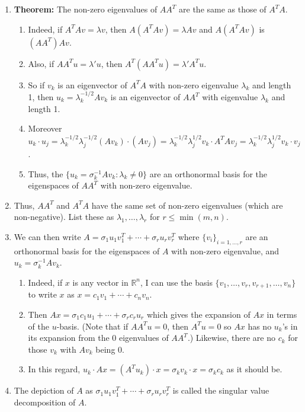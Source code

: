 \begin{enumerate}
    \item \textbf{Theorem:} The non-zero eigenvalues of $A A^T$ are the same as those of $A^T A$.
    \begin{enumerate}    \setlength{\itemsep}{5em}

        \item Indeed, if $A^T A v = \lambda v$, then $A (A^T A v) = \lambda A v$ and $A (A^T A v)$ is $(A A^T) A v$.
        \item Also, if $A A^T u = \lambda' u$, then $A^T (A A^T u) = \lambda' A^T u$.
        \item So if $v_k$ is an eigenvector of $A^T A$ with non-zero eigenvalue $\lambda_k$ and length 1, then $u_k = \lambda_k^{-1/2} A v_k$ is an eigenvector of $A A^T$ with eigenvalue $\lambda_k$ and length 1.
        \item Moreover $u_k \cdot u_j = \lambda_k^{-1/2} \lambda_j^{-1/2} (A v_k) \cdot (A v_j) = \lambda_k^{-1/2} \lambda_j^{1/2} v_k \cdot A^T A v_j = \lambda_k^{-1/2} \lambda_j^{1/2} v_k \cdot v_j$.
        \item Thus, the $\{ u_k = \sigma_k^{-1} A v_k : \lambda_k \neq 0\}$ are an orthonormal basis for the eigenspaces of $A A^T$ with non-zero eigenvalue.
    \end{enumerate}

\newpage     \setlength{\itemsep}{7em}


    \item Thus, $A A^T$ and $A^T A$ have the same set of non-zero eigenvalues (which are non-negative). List these as $\lambda_1, \dots, \lambda_r$ for $r \leq \min(m, n)$.
    \item We can then write $A = \sigma_1 u_1 v_1^T + \cdots + \sigma_r u_r v_r^T$ where $\{v_i\}_{i=1,\dots,r}$ are an orthonormal basis for the eigenspaces of $A$ with non-zero eigenvalue, and $u_k = \sigma_k^{-1} A v_k$.
    \begin{enumerate}    \setlength{\itemsep}{5em}

        \item Indeed, if $x$ is any vector in $\mathbb{R}^n$, I can use the basis $\{v_1, \dots, v_r, v_{r+1}, \dots, v_n\}$ to write $x$ as $x = c_1 v_1 + \cdots + c_n v_n$.
        \item Then $A x = \sigma_1 c_1 u_1 + \cdots + \sigma_r c_r u_r$ which gives the expansion of $A x$ in terms of the $u$-basis. (Note that if $A A^T u = 0$, then $A^T u = 0$ so $A x$ has no $u_k$'s in its expansion from the 0 eigenvalues of $A A^T$.) Likewise, there are no $c_k$ for those $v_k$ with $A v_k$ being 0.
        \item In this regard, $u_k \cdot A x = (A^T u_k) \cdot x = \sigma_k v_k \cdot x = \sigma_k c_k$ as it should be.
    \end{enumerate}

    \item The depiction of $A$ as $\sigma_1 u_1 v_1^T + \cdots + \sigma_r u_r v_r^T$ is called the singular value decomposition of $A$.

\end{enumerate}
\newpage

